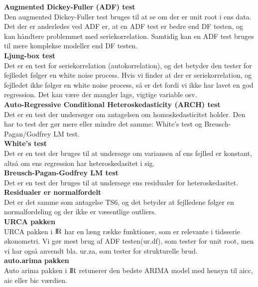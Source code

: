 \documentclass[
  10pt,
]{article}
\begin{document}
\textbf{Augmented Dickey-Fuller (ADF) test }\\
Den augmented Dickey-Fuller test bruges til at se om der er unit root i
ens data. Det der er anderledes ved ADF er, at en ADF test er bedre end
DF testen, og kan håndtere problemmet med seriekorrelation. Samtidig kan
en ADF test bruges til mere komplekse modeller end DF testen.\\

\textbf{Ljung-box test}\\
Det er en test for seriekorrelation (autokorrelation), og det betyder
den tester for fejlledet følger en white noise process. Hvis vi finder
at der er seriekorrelation, og fejlledet ikke følger en white noise
process, så er det fordi vi ikke har lavet en god regression. Det kan
være der mangler lags, vigtige variable osv.\\

\textbf{Auto-Regressive Conditional Heteroskedasticity (ARCH) test}\\
Det er en test der undersøger om antagelsen om homoskedasticitet holder.
Den har to test der gør mere eller mindre det samme: White's test og
Breusch-Pagan/Godfrey LM test.\\

\textbf{White's test}\\
Det er en test der bruges til at undersøge om variansen af ens fejlled
er konstant, altså om ens regression har heteroskedasitet i sig.\\

\textbf{Breusch-Pagan-Godfrey LM test}\\
Det er en test der bruges til at undersøge ens residualer for
heteroskedasitet.\\

\textbf{Residualer er normalfordelt}\\
Det er det samme som antagelse TS6, og det betyder at fejlledene følger
en normalfordeling og der ikke er væsentlige outliers.\\

\textbf{URCA pakken}\\
URCA pakken i \({\rm I\!R}\) har en læng række funktioner, som er
relevante i tidsserie økonometri. Vi gør mest brug af ADF testen(ur.df),
som tester for unit root, men vi har også anvendt bla. ur.za, som tester
for strukturelle brud.\\

\textbf{auto.arima pakken}\\
Auto arima pakken i \({\rm I\!R}\) retunerer den bedste ARIMA model med
hensyn til aicc, aic eller bic værdien.\\
\end{document}
